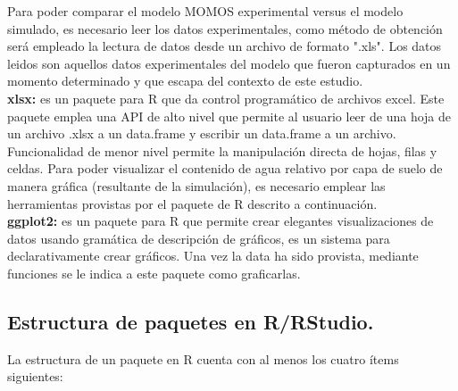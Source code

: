 Para poder comparar el modelo MOMOS experimental versus el modelo simulado, es necesario leer los datos experimentales, como método de obtención será empleado la lectura de datos desde un archivo de formato ".xls". Los datos leidos son aquellos datos experimentales del modelo que fueron capturados en un momento determinado y que escapa del contexto de este estudio.\\

\textbf{ xlsx:} es un paquete para R que da control programático de archivos excel. Este paquete emplea una API de alto nivel que permite al usuario leer de una hoja de un archivo .xlsx a un data.frame y escribir un data.frame a un archivo. Funcionalidad de menor nivel permite la manipulación directa de hojas, filas y celdas. Para poder visualizar el contenido de agua relativo por capa de suelo de manera gráfica (resultante de la simulación), es necesario emplear las herramientas provistas por el paquete de R descrito a continuación.\\

\textbf{ggplot2:} es un paquete para R que permite crear elegantes visualizaciones de datos usando gramática de descripción de gráficos, es un sistema para declarativamente crear gráficos. Una vez la data ha sido provista, mediante funciones se le indica a este paquete como graficarlas.\\

\subsection{Estructura de paquetes en R/RStudio.}

La estructura de un paquete en R cuenta con al menos los cuatro \'items siguientes:

